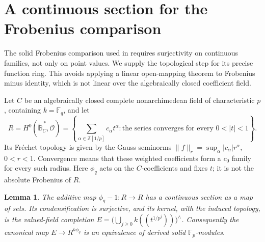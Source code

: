 \documentclass[11pt]{article}
\numberwithin{equation}{section}
\newtheorem{lemma}[theorem]{Lemma}
\theoremstyle{definition}
\theoremstyle{remark}
\newcommand{\Z}{\mathbb Z}
\newcommand{\F}{\mathbb F}
\newcommand{\cO}{\mathcal O}
\begin{document}
\section{A continuous section for the Frobenius comparison}
\label{app:frobenius}

The solid Frobenius comparison used in
 requires surjectivity on continuous
families, not only on point values.  We supply the topological step for
its precise function ring.  This avoids applying a linear open-mapping
theorem to Frobenius minus identity, which is not linear over the
algebraically closed coefficient field.

Let $C$ be an algebraically closed complete nonarchimedean field of
characteristic $p$, containing $k=\F_q$, and let
\[
 R=H^0(\widetilde{\mathbb B}^{\,*}_C,\cO)
   =\left\{\sum_{\alpha\in\Z[1/p]}c_\alpha t^\alpha:
                 \text{the series converges for every }0<|t|<1\right\}.
\]
Its Fr\'echet topology is given by the Gauss seminorms
$\|f\|_r=\sup_\alpha |c_\alpha|r^\alpha$, $0<r<1$.
Convergence means that these weighted coefficients form a $c_0$ family
for every such radius.  Here $\phi_q$ acts on the $C$-coefficients
and fixes $t$; it is not the absolute Frobenius of $R$.

\begin{lemma}\label{lem:continuous-as-section}
The additive map $\phi_q-1:R\to R$ has a continuous section as a map
of sets.  Its condensification is surjective, and its kernel, with the
induced topology, is the valued-field completion
$E=\bigl(\bigcup_{j\ge0}k((t^{1/p^j}))\bigr)^{\wedge}$.
Consequently the canonical map $E\to R^{h\phi_q}$ is an equivalence
of derived solid $\F_p$-modules.
\end{lemma}
\end{document}
